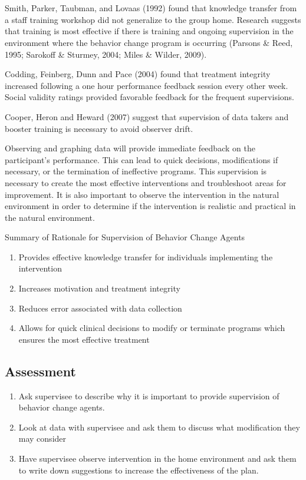 \clearpage \section{\fourkSix{}}
Smith, Parker, Taubman, and Lovaas (1992) found that knowledge transfer from a staff training workshop did not generalize to the group home.  Research suggests that training is most effective if there is training and ongoing supervision in the environment where the behavior change program is occurring (Parsons \& Reed, 1995; Sarokoff \& Sturmey, 2004; Miles \& Wilder, 2009).

Codding, Feinberg, Dunn and Pace (2004) found that treatment integrity increased following a one hour performance feedback session every other week.  Social validity ratings provided favorable feedback for the frequent supervisions. 

Cooper, Heron and Heward (2007) suggest that supervision of data takers and booster training is necessary to avoid observer drift. 

Observing and graphing data will provide immediate feedback on the participant's performance.  This can lead to quick decisions, modifications if necessary, or the termination of ineffective programs.  This supervision is necessary to create the most effective interventions and troubleshoot areas for improvement. It is also important to observe the intervention in the natural environment in order to determine if the intervention is realistic and practical in the natural environment.

Summary of Rationale for Supervision of Behavior Change Agents
\begin{enumerate}
\item Provides effective knowledge transfer for individuals implementing the intervention
\item Increases motivation and treatment integrity
\item Reduces error associated with data collection
\item Allows for quick clinical decisions to modify or terminate programs which ensures the most effective treatment
\end{enumerate}
%
\subsection{Assessment}
\begin{enumerate}
\item Ask supervisee to describe why it is important to provide supervision of behavior change agents.
\item Look at data with supervisee and ask them to discuss what modification they may consider
\item Have supervisee observe intervention in the home environment and ask them to write down suggestions to increase the effectiveness of the plan.
%
\end{enumerate}
%
